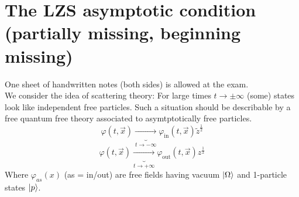 \documentclass{report}
\begin{document}
\section{The LZS asymptotic condition (partially missing, beginning missing)}
One sheet of handwritten notes (both sides) is allowed at the exam.\\
We consider the idea of scattering theory: For large times $t \to \pm \infty$ (some) states look like independent free particles. Such a situation should be describable by a free quantum free theory associated to asymtptotically free particles. \[
\varphi\left( t, \vec{x} \right) \underbrace{\to }_{t \to -\infty} \varphi_{\text{in}}\left( t, \vec{x} \right)  \tilde{z}^{\frac{1}{2} } 
\] \[
\varphi\left( t, \vec{x} \right) \underbrace{\to }_{t \to  + \infty} \varphi_{\text{out}} \left( t, \vec{x} \right) z^{\frac{1}{2} } 
\] 
Where $\varphi_{as} \left( x \right) $ (as = in/out) are free fields having vacuum $\ket{\Omega} $ and 1-particle states $\ket{p} $.
\end{document}
